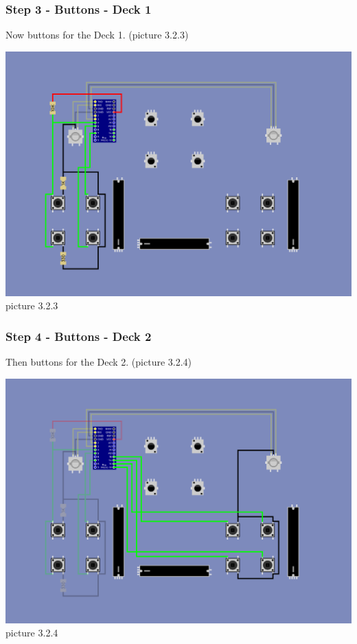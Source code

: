 \documentclass[12pt, a4paper]{article}
\begin{document}
				\newpage
			
			\subsubsection{Step 3 - Buttons - Deck 1}
						
				\noindent Now buttons for the Deck 1. (picture 3.2.3)
				
				\begin{center}
					\includegraphics[width=1\linewidth]{assets/illustrated_schematic_step3.png}
					picture 3.2.3
				\end{center} 
				
				\newpage
			
			\subsubsection{Step 4 - Buttons - Deck 2}
						
				\noindent Then buttons for the Deck 2. (picture 3.2.4)
			
				\begin{center}
					\includegraphics[width=1\linewidth]{assets/illustrated_schematic_step4.png}
					picture 3.2.4
				\end{center} 
				
\end{document}
